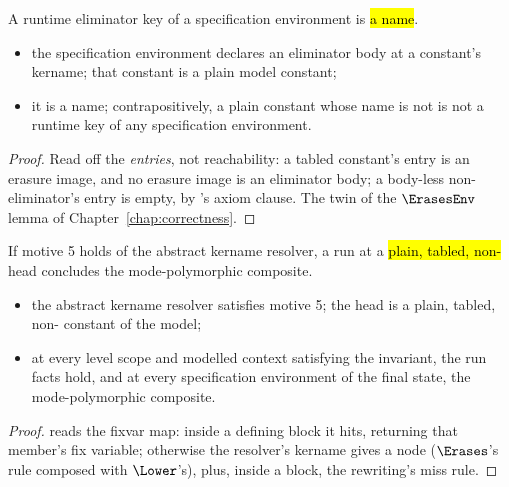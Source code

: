 \begin{lemma}
\label{lem:SpecContent-runtimeKey_isCasesOn}
\leanok
{}
 A runtime eliminator key of a specification environment is \hl{a  name}.
\begin{itemize}
\item {} the specification environment declares an eliminator body at a constant's kername;
that constant is a plain model constant;
\item {} it is a  name; contrapositively, a plain constant whose name is not
 is not a runtime key of any specification environment.
\end{itemize}
\end{lemma}
\begin{proof}
\leanok
{}
 Read off the \emph{entries}, not reachability: a tabled constant's entry is an erasure image,
and no erasure image is an eliminator body; a body-less non-eliminator's entry is empty, by
's axiom clause. The  twin of the $\ErasesEnv$ lemma of
Chapter~\ref{chap:correctness}.
\end{proof}

\begin{lemma}
\label{lem:visitConst_refines}
\leanok
{}
 If motive 5 holds of the abstract kername resolver, a run at a \hl{plain, tabled,
non-} head concludes the mode-polymorphic composite.
\begin{itemize}
\item {} the abstract kername resolver satisfies motive 5; the head  is a
plain, tabled, non- constant of the model;
\item {} at every level scope and modelled context satisfying the invariant, the run facts
hold, and at every specification environment of the final state, the mode-polymorphic composite.
\end{itemize}
\end{lemma}
\begin{proof}
\leanok
{}
  reads the fixvar map: inside a defining block it hits, returning that
member's fix variable; otherwise the resolver's kername gives a  node ($\Erases$'s
 rule composed with $\Lower$'s), plus, inside a block, the rewriting's miss rule.
\end{proof}


